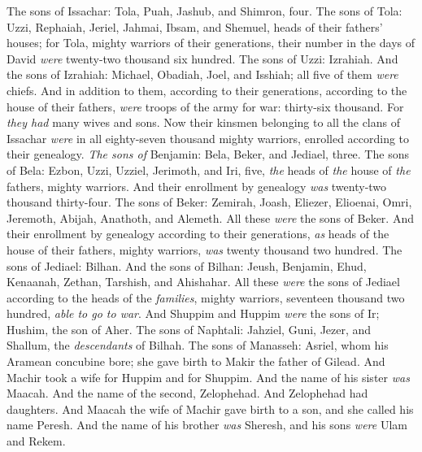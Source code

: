\begin{biblechapter} %
 The sons of Issachar: Tola, Puah, Jashub, and Shimron, four.
\verse The sons of Tola: Uzzi, Rephaiah, Jeriel, Jahmai, Ibsam, and Shemuel, heads of their fathers’ houses; for Tola, mighty warriors of their generations, their number in the days of David \textit{were} twenty-two thousand six hundred.
\verse The sons of Uzzi: Izrahiah. And the sons of Izrahiah: Michael, Obadiah, Joel, and Isshiah; all five of them \textit{were} chiefs.
\verse And in addition to them, according to their generations, according to the house of their fathers, \textit{were} troops of the army for war: thirty-six thousand. For \textit{they had} many wives and sons.
\verse Now their kinsmen belonging to all the clans of Issachar \textit{were} in all eighty-seven thousand mighty warriors, enrolled according to their genealogy.
 \textit{The sons of} Benjamin: Bela, Beker, and Jediael, three.
\verse The sons of Bela: Ezbon, Uzzi, Uzziel, Jerimoth, and Iri, five, \textit{the} heads of \textit{the} house of \textit{the} fathers, mighty warriors. And their enrollment by genealogy \textit{was} twenty-two thousand thirty-four.
\verse The sons of Beker: Zemirah, Joash, Eliezer, Elioenai, Omri, Jeremoth, Abijah, Anathoth, and Alemeth. All these \textit{were} the sons of Beker.
\verse And their enrollment by genealogy according to their generations, \textit{as} heads of the house of their fathers, mighty warriors, \textit{was} twenty thousand two hundred.
\verse The sons of Jediael: Bilhan. And the sons of Bilhan: Jeush, Benjamin, Ehud, Kenaanah, Zethan, Tarshish, and Ahishahar.
\verse All these \textit{were} the sons of Jediael according to the heads of the \textit{families}, mighty warriors, seventeen thousand two hundred, \textit{able to go to war}.
\verse And Shuppim and Huppim \textit{were} the sons of Ir; Hushim, the son of Aher.
 The sons of Naphtali: Jahziel, Guni, Jezer, and Shallum, the \textit{descendants} of Bilhah.
 The sons of Manasseh: Asriel, whom his Aramean concubine bore; she gave birth to Makir the father of Gilead.
\verse And Machir took a wife for Huppim and for Shuppim. And the name of his sister \textit{was} Maacah. And the name of the second, Zelophehad. And Zelophehad had daughters.
\verse And Maacah the wife of Machir gave birth to a son, and she called his name Peresh. And the name of his brother \textit{was} Sheresh, and his sons \textit{were} Ulam and Rekem.

\end{biblechapter}
